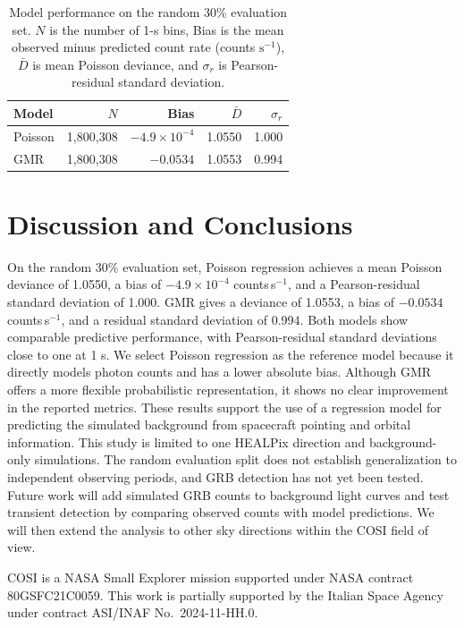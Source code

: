 \documentclass[11pt,twoside]{article}
\begin{document}



\begin{table}
\caption{Model performance on the random 30\% evaluation set. $N$ is the number of 1-s bins, Bias is the mean observed minus predicted count rate (counts $\mathrm{s}^{-1}$), $\bar{D}$ is mean Poisson deviance, and $\sigma_r$ is Pearson-residual standard deviation.}
\vspace{0.1in}
\centering
\begin{tabular}{l r r r r}
\hline
Model & $N$ & Bias & $\bar{D}$ & $\sigma_r$ \\
\hline
Poisson & 1,800,308 & $-4.9\times10^{-4}$ & 1.0550 & 1.000 \\
GMR & 1,800,308 & $-0.0534$ & 1.0553 & 0.994 \\
\hline
\end{tabular}
\end{table}


\section{Discussion and Conclusions}

On the random 30\% evaluation set, Poisson regression achieves a mean Poisson deviance of 1.0550, a bias of $-4.9\times10^{-4}$ counts\,s$^{-1}$, and a Pearson-residual standard deviation of 1.000. GMR gives a deviance of 1.0553, a bias of $-0.0534$ counts\,s$^{-1}$, and a residual standard deviation of 0.994. Both models show comparable predictive performance, with Pearson-residual standard deviations close to one at 1 s.  We select Poisson regression as the reference model because it directly models photon counts and has a lower absolute bias. Although GMR offers a more flexible probabilistic representation, it shows no clear improvement in the reported metrics. These results support the use of a regression model for predicting the simulated background from spacecraft pointing and orbital information. This study is limited to one HEALPix direction and background-only simulations. The random evaluation split does not establish generalization to independent observing periods, and GRB detection has not yet been tested. Future work will add simulated GRB counts to background light curves and test transient detection by comparing observed counts with model predictions. We will then extend the analysis to other sky directions within the COSI field of view.


\acknowledgments
COSI is a NASA Small Explorer mission supported under NASA contract 80GSFC21C0059. This work is partially supported by the Italian Space Agency under contract ASI/INAF No.~2024-11-HH.0.


\end{document}

